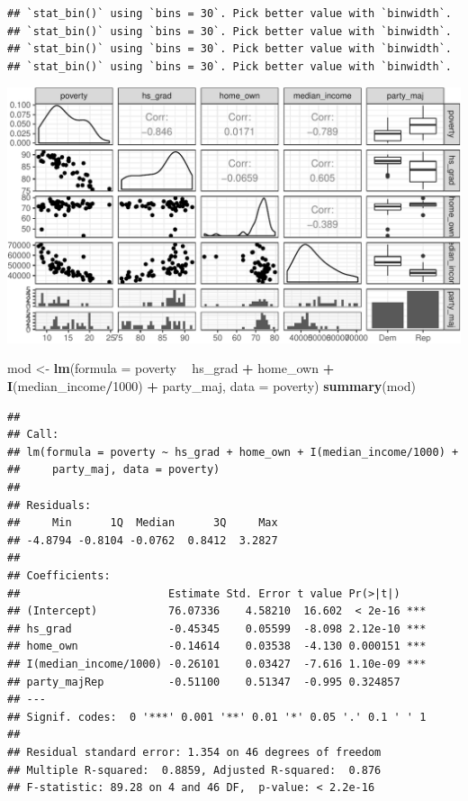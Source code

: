 \documentclass[]{article}
\newenvironment{Shaded}{\begin{snugshade}}{\end{snugshade}}
\newcommand{\DataTypeTok}[1]{\textcolor[rgb]{0.13,0.29,0.53}{#1}}
\newcommand{\DecValTok}[1]{\textcolor[rgb]{0.00,0.00,0.81}{#1}}
\newcommand{\KeywordTok}[1]{\textcolor[rgb]{0.13,0.29,0.53}{\textbf{#1}}}
\newcommand{\NormalTok}[1]{#1}
\newcommand{\OperatorTok}[1]{\textcolor[rgb]{0.81,0.36,0.00}{\textbf{#1}}}
\newcommand{\StringTok}[1]{\textcolor[rgb]{0.31,0.60,0.02}{#1}}
\begin{document}
\begin{verbatim}
## `stat_bin()` using `bins = 30`. Pick better value with `binwidth`.
## `stat_bin()` using `bins = 30`. Pick better value with `binwidth`.
## `stat_bin()` using `bins = 30`. Pick better value with `binwidth`.
## `stat_bin()` using `bins = 30`. Pick better value with `binwidth`.
\end{verbatim}

\includegraphics{forchapter5_files/figure-latex/05-pairplot-1.pdf}

\begin{Shaded}
\begin{Highlighting}[]
\NormalTok{mod <-}\StringTok{ }\KeywordTok{lm}\NormalTok{(}\DataTypeTok{formula =}\NormalTok{ poverty }\OperatorTok{~}\StringTok{ }\NormalTok{hs_grad }\OperatorTok{+}\StringTok{ }\NormalTok{home_own }\OperatorTok{+}\StringTok{ }\KeywordTok{I}\NormalTok{(median_income}\OperatorTok{/}\DecValTok{1000}\NormalTok{) }\OperatorTok{+}
\StringTok{            }\NormalTok{party_maj, }\DataTypeTok{data =}\NormalTok{ poverty)}
\KeywordTok{summary}\NormalTok{(mod)}
\end{Highlighting}
\end{Shaded}

\begin{verbatim}
## 
## Call:
## lm(formula = poverty ~ hs_grad + home_own + I(median_income/1000) + 
##     party_maj, data = poverty)
## 
## Residuals:
##     Min      1Q  Median      3Q     Max 
## -4.8794 -0.8104 -0.0762  0.8412  3.2827 
## 
## Coefficients:
##                       Estimate Std. Error t value Pr(>|t|)    
## (Intercept)           76.07336    4.58210  16.602  < 2e-16 ***
## hs_grad               -0.45345    0.05599  -8.098 2.12e-10 ***
## home_own              -0.14614    0.03538  -4.130 0.000151 ***
## I(median_income/1000) -0.26101    0.03427  -7.616 1.10e-09 ***
## party_majRep          -0.51100    0.51347  -0.995 0.324857    
## ---
## Signif. codes:  0 '***' 0.001 '**' 0.01 '*' 0.05 '.' 0.1 ' ' 1
## 
## Residual standard error: 1.354 on 46 degrees of freedom
## Multiple R-squared:  0.8859, Adjusted R-squared:  0.876 
## F-statistic: 89.28 on 4 and 46 DF,  p-value: < 2.2e-16
\end{verbatim}
\end{document}
